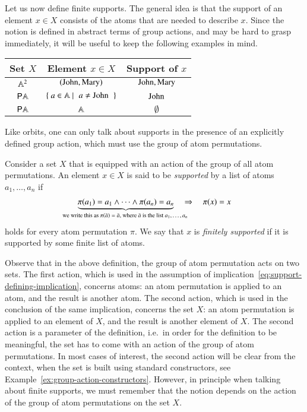 Let us now define finite supports.
 The general idea is that the support of an  element $x \in X$ consists of  the atoms that are needed to describe $x$. Since the notion is defined in abstract terms of group actions, and  may be hard to grasp immediately, it will be useful to keep the following examples in mind.

\begin{center}
    \begin{tabular}{c|c|c}
        Set $X$ & Element $x \in X$ & Support of $x$\\
        \hline
        $\mathbb A^2$ & $(\text{John},\text{Mary})$ & $\text{John},\text{Mary}$\\
        ${\mathsf P} \mathbb A$ & \quad  $\setbuild{a \in \atoms}{$a \neq \john$}$ \quad & $\text{John}$\\
        ${\mathsf P} \mathbb A$ & $\mathbb A$ & $\emptyset$
    \end{tabular}
\end{center}

Like orbits, one can only talk about supports in the presence of an explicitly defined group action, which must use the group of atom permutations. 
\begin{definition}[Supports]\label{def:supports-equality}
    Consider a set $X$ that is equipped with an action of the group of all  atom permutations. An element $x \in X$ is said to be \emph{supported} by  a list of  atoms $a_1,\ldots,a_n$ if 
    \begin{align}\label{eq:support-defining-implication}
    \myunderbrace{\pi(a_1)=a_1 \land \cdots \land \pi(a_n)=a_n}{we write this as $\pi(\bar a)= \bar a$, where $\bar a$ is the list $a_1,\ldots,a_n$}  
    \quad \Rightarrow \quad 
    \pi(x) = x
    \end{align}
    holds for every atom permutation $\pi$. We say that $x$ is \emph{finitely supported} if it is supported by some finite list of atoms.
\end{definition}

Observe that in the above definition, the group of atom permutation acts on two sets. The first action, which is used in the assumption of implication~\eqref{eq:support-defining-implication}, concerns atoms: an atom permutation is applied to an atom, and the result is another atom.  The second action, which is used in the conclusion of the same implication, concerns the set $X$: an atom permutation is applied to an element of $X$, and the result is another element of $X$. The second action is a parameter of the definition, i.e.~in order for the definition to be meaningful, the set has to come with an action of the group of atom permutations. In most cases of interest, the second action will be clear from the context, when the set is built using  standard constructors, see Example~\ref{ex:group-action-constructors}.  However, in principle when talking about finite supports, we must remember that the notion depends on the action of the group of atom permutations on the set $X$.


